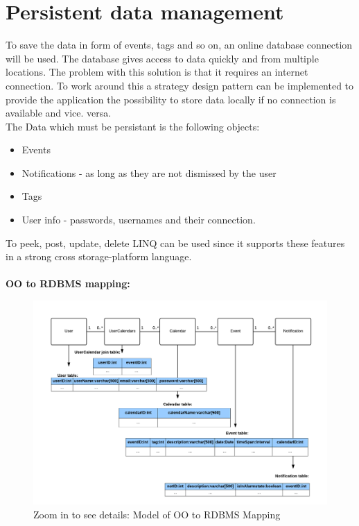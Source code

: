 \section{Persistent data management}
To save the data in form of events, tags and so on, an online database connection will be used. The database gives access to data quickly and from multiple locations. The problem with this solution is that it requires an internet connection. To work around this a strategy design pattern can be implemented to provide the application the possibility to store data locally if no connection is available and vice. versa. \\
The Data which must be persistant is the following objects:
\begin{itemize}
	\item Events
	\item Notifications - as long as they are not dismissed by the user
	\item Tags 
	\item User info - passwords, usernames and their connection.
\end{itemize}
To peek, post, update, delete LINQ can be used since it supports these features in a strong cross storage-platform language.\\\\

\newpage
\textbf{OO to RDBMS mapping:}

\begin{figure}[h!]
	\centering
		\includegraphics[scale=0.8]{OOtoRDBMSMapping}
	\caption{Zoom in to see details: Model of OO to RDBMS Mapping}
	\label{fig:OO to RDBMS Mapping}
\end{figure}

